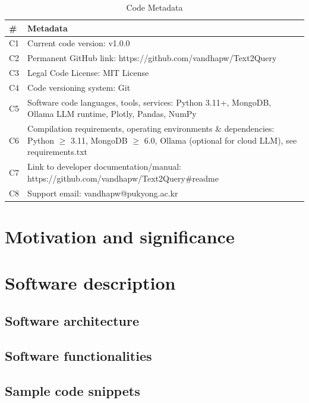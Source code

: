 \documentclass[preprint,12pt, a4paper]{elsarticle}
\begin{document}
\begin{table}[H]
\centering
\caption{Code Metadata}
\label{tab:code-metadata}
\begin{tabular}{|l|p{10cm}|}
\hline
\textbf{\#} & \textbf{Metadata} \\
\hline
C1 & Current code version: v1.0.0 \\
\hline
C2 & Permanent GitHub link: https://github.com/vandhapw/Text2Query \\
\hline
C3 & Legal Code License: MIT License \\
\hline
C4 & Code versioning system: Git \\
\hline
C5 & Software code languages, tools, services: Python 3.11+, MongoDB, Ollama LLM runtime, Plotly, Pandas, NumPy \\
\hline
C6 & Compilation requirements, operating environments \& dependencies: Python $\geq$ 3.11, MongoDB $\geq$ 6.0, Ollama (optional for cloud LLM), see requirements.txt \\
\hline
C7 & Link to developer documentation/manual: https://github.com/vandhapw/Text2Query\#readme \\
\hline
C8 & Support email: vandhapw@pukyong.ac.kr \\
\hline
\end{tabular}
\end{table}

\section{Motivation and significance}

\section{Software description}

\subsection{Software architecture}

\subsection{Software functionalities}

\subsection{Sample code snippets}
\end{document}
